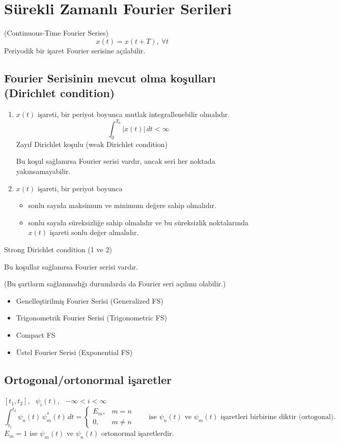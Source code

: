 \documentclass[11pt,a4paper]{article}
\begin{document}
\renewcommand{\thempfootnote}{\alph{mpfootnote}} %

\section{Sürekli Zamanlı Fourier Serileri}
(Continuous-Time Fourier Series)
\[ x(t) = x(t+T), \ \forall t \]
Periyodik bir işaret Fourier serisine açılabilir.

\subsection{Fourier Serisinin mevcut olma koşulları \normalfont(Dirichlet condition)}
\begin{enumerate}[label=\arabic*)]
  \item $x(t)$ işareti, bir periyot boyunca mutlak integrallenebilir olmalıdır.
  \[ \int_{0}^{T_0} |x(t)|\,dt < \infty \]
  Zayıf Dirichlet koşulu (weak Dirichlet condition)

  Bu koşul sağlanırsa Fourier serisi vardır, ancak seri her noktada yakınsamayabilir.
  \item $x(t)$ işareti, bir periyot boyunca
  \begin{itemize}[label=--]
    \item sonlu sayıda maksimum ve minimum değere sahip olmalıdır.
    \item sonlu sayıda süreksizliğe sahip olmalıdır ve bu süreksizlik noktalarında $x(t)$ işareti sonlu değer almalıdır.
  \end{itemize}
\end{enumerate}
Strong Dirichlet condition (1 ve 2)

Bu koşullar sağlanırsa Fourier serisi vardır.

(Bu şartların sağlanmadığı durumlarda da Fourier seri açılımı olabilir.)

\begin{itemize}[label=--]
  \item Genelleştirilmiş Fourier Serisi (Generalized FS)
  \item Trigonometrik Fourier Serisi (Trigonometric FS)
  \item Compact FS
  \item Üstel Fourier Serisi (Exponential FS)
\end{itemize}

\subsection{Ortogonal/ortonormal işaretler}
$[t_1, t_2]$, \ $\psi_i(t)$, \ $-\infty < i < \infty$
\[ \int_{t_1}^{t_2} \psi_n(t)\,\psi_m^{*}(t)\,dt = \begin{cases} E_m, & m = n \\ 0, & m \neq n \end{cases} \qquad \text{ise } \psi_n(t) \text{ ve } \psi_m(t) \text{ işaretleri birbirine diktir (ortogonal).} \]
$E_m = 1$ ise $\psi_m(t)$ ve $\psi_n(t)$ ortonormal işaretlerdir.
\end{document}
